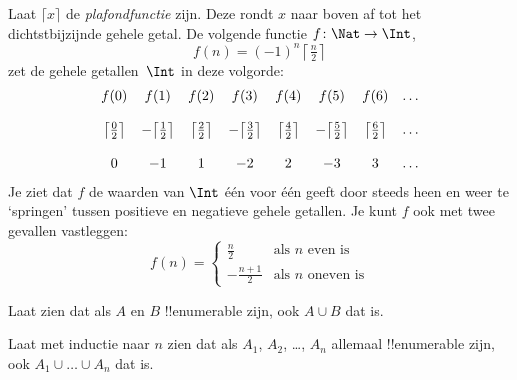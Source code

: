 \documentclass[../../../include/open-logic-section]{subfiles}
\begin{document}
\begin{ex}
Laat $\lceil x \rceil$ de \emph{plafondfunctie} zijn. Deze rondt $x$
naar boven af tot het dichtstbijzijnde gehele getal. De volgende
functie $f \colon \Nat \to \Int$,
\[
  f(n) = (-1)^{n} \left\lceil\tfrac{n}{2}\right\rceil
\]
zet de gehele getallen~$\Int$ in deze volgorde:
\[
\begin{array}{c c c c c c c c}
f(0) & f(1) & f(2) & f(3) & f(4) & f(5) & f(6) & \dots \\ \\
\big\lceil \tfrac{0}{2} \big\rceil & -\big\lceil \tfrac{1}{2}\big\rceil &  \big\lceil \tfrac{2}{2} \big\rceil & -\big\lceil \tfrac{3}{2} \big\rceil & \big\lceil \tfrac{4}{2} \big\rceil  & -\big\lceil \tfrac{5}{2}\big\rceil & \big\lceil \tfrac{6}{2} \big\rceil & \dots \\ \\
0 & -1 & 1 & -2 & 2 & -3 & 3& \dots
\end{array}
\]
Je ziet dat $f$ de waarden van $\Int$ één voor één geeft door steeds
heen en weer te ‘springen’ tussen positieve en negatieve gehele getallen. Je kunt
$f$ ook met twee gevallen vastleggen:
\[
f(n) = \begin{cases}
  \frac{n}{2} & \text{als $n$ even is}\\
  -\frac{n+1}{2} & \text{als $n$ oneven is}
  \end{cases}
\]
\end{ex}

\begin{prob}
Laat zien dat als $A$ en $B$ !!{enumerable} zijn, ook $A \cup B$ dat
is.
\end{prob}

\begin{prob}
Laat met inductie naar $n$ zien dat als $A_1$, $A_2$, \dots, $A_n$
allemaal !!{enumerable} zijn, ook $A_1 \cup \dots \cup A_n$ dat is.
\end{prob}
\end{document}
